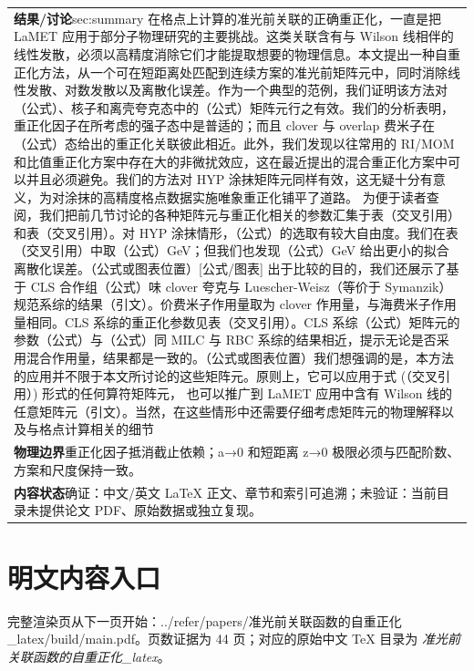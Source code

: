 \documentclass[UTF8,11pt,oneside]{ctexbook}
\begin{document}
\begin{table}[htbp]
\begin{tabular}{@{}p{}@{}}
    \textbf{结果/讨论}\quad sec:summary 在格点上计算的准光前关联的正确重正化，一直是把 LaMET 应用于部分子物理研究的主要挑战。这类关联含有与 Wilson 线相伴的线性发散，必须以高精度消除它们才能提取想要的物理信息。本文提出一种自重正化方法，从一个可在短距离处匹配到连续方案的准光前矩阵元中，同时消除线性发散、对数发散以及离散化误差。作为一个典型的范例，我们证明该方法对（公式）、核子和离壳夸克态中的（公式）矩阵元行之有效。我们的分析表明，重正化因子在所考虑的强子态中是普适的；而且 clover 与 overlap 费米子在（公式）态给出的重正化关联彼此相近。此外，我们发现以往常用的 RI/MOM 和比值重正化方案中存在大的非微扰效应，这在最近提出的混合重正化方案中可以并且必须避免。我们的方法对 HYP 涂抹矩阵元同样有效，这无疑十分有意义，为对涂抹的高精度格点数据实施唯象重正化铺平了道路。 为便于读者查阅，我们把前几节讨论的各种矩阵元与重正化相关的参数汇集于表（交叉引用）和表（交叉引用）。对 HYP 涂抹情形，（公式）的选取有较大自由度。我们在表（交叉引用）中取（公式）GeV；但我们也发现（公式）GeV 给出更小的拟合离散化误差。（公式或图表位置）[公式/图表] 出于比较的目的，我们还展示了基于 CLS 合作组（公式）味 clover 夸克与 Luescher-Weisz（等价于 Symanzik）规范系综的结果（引文）。价费米子作用量取为 clover 作用量，与海费米子作用量相同。CLS 系综的重正化参数见表（交叉引用）。CLS 系综（公式）矩阵元的参数（公式）与（公式）同 MILC 与 RBC 系综的结果相近，提示无论是否采用混合作用量，结果都是一致的。（公式或图表位置）我们想强调的是，本方法的应用并不限于本文所讨论的这些矩阵元。原则上，它可以应用于式 (（交叉引用）) 形式的任何算符矩阵元， 也可以推广到 LaMET 应用中含有 Wilson 线的任意矩阵元（引文）。当然，在这些情形中还需要仔细考虑矩阵元的物理解释以及与格点计算相关的细节 \\
    \textbf{物理边界}\quad 重正化因子抵消截止依赖；a→0 和短距离 z→0 极限必须与匹配阶数、方案和尺度保持一致。 \\
    \textbf{内容状态}\quad 确证：中文/英文 LaTeX 正文、章节和索引可追溯；未验证：当前目录未提供论文 PDF、原始数据或独立复现。 \\
    \bottomrule
  \end{tabular}
\end{table}
\section*{明文内容入口}
\noindent 完整渲染页从下一页开始：../\allowbreak{}refer/\allowbreak{}papers/\allowbreak{}准光前关联函数的自重正化\_\allowbreak{}latex/\allowbreak{}build/\allowbreak{}main.pdf。页数证据为 44 页；对应的原始中文 TeX 目录为 \emph{准光前关联函数的自重正化\_latex}。
\clearpage

\clearpage
\end{document}
